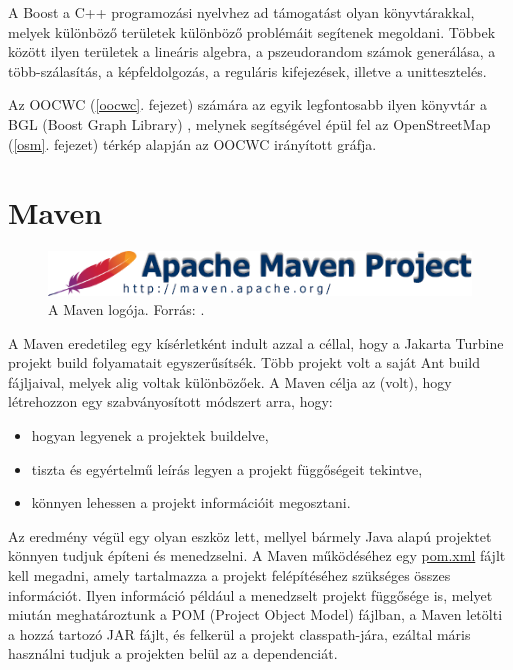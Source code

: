 \documentclass[a4paper,12pt]{report}
\begin{document}
\vspace{2mm}
A Boost a C++ programozási nyelvhez ad támogatást olyan könyvtárakkal, melyek különböző területek különböző problémáit segítenek megoldani. Többek között ilyen területek a lineáris algebra, a pszeudorandom számok generálása, a több-szálasítás, a képfeldolgozás, a reguláris kifejezések, illetve a unittesztelés. 

\vspace{2mm}
Az OOCWC (\ref{oocwc}. fejezet) számára az egyik legfontosabb ilyen könyvtár a BGL (Boost Graph Library) \cite{bgl}, melynek segítségével épül fel az OpenStreetMap \cite{osm} (\ref{osm}. fejezet) térkép alapján az OOCWC irányított gráfja.

\newpage
\section{Maven}
\label{maven}

\begin{figure}[ht]
\centerline{
\includegraphics[width=4.5in]{img/mavenlogo}}
\caption{A Maven logója. Forrás: \cite{mavenlogo}.}
\label{mavenlogo}
\end{figure}

A Maven eredetileg egy kísérletként indult azzal a céllal, hogy a Jakarta Turbine projekt \cite{turbine} build folyamatait egyszerűsítsék. Több projekt volt a saját Ant \cite{ant} build fájljaival, melyek alig voltak különbözőek. A Maven célja az (volt), hogy létrehozzon egy szabványosított módszert arra, hogy:

\begin{itemize}
\item hogyan legyenek a projektek buildelve,
\item tiszta és egyértelmű leírás legyen a projekt függőségeit tekintve,
\item könnyen lehessen a projekt információit megosztani.
\end{itemize}

Az eredmény végül egy olyan eszköz lett, mellyel bármely Java alapú projektet könnyen tudjuk építeni és menedzselni. A Maven működéséhez egy \url{pom.xml} fájlt kell megadni, amely tartalmazza a projekt felépítéséhez szükséges összes információt. Ilyen információ például a menedzselt projekt függősége is, melyet miután meghatároztunk a POM (Project Object Model) fájlban, a Maven letölti a hozzá tartozó JAR fájlt, és felkerül a projekt classpath-jára, ezáltal máris használni tudjuk a projekten belül az a dependenciát.
\end{document}
